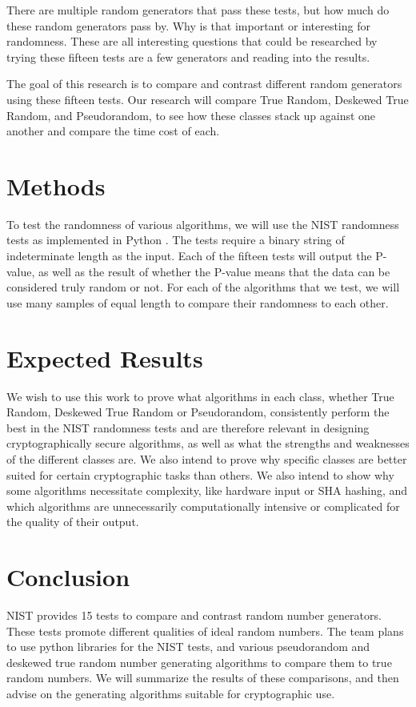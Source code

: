\documentclass[11pt,letterpaper,conference]{IEEEtran}
\begin{document}
There are multiple random generators that pass these tests, but how much do these random
generators pass by. Why is that important or interesting for randomness. These are all interesting
questions that could be researched by trying these fifteen tests are a few generators and reading
into the results.

The goal of this research is to compare and contrast different random generators using these fifteen tests. Our research will compare True Random, Deskewed True Random, and Pseudorandom, to see how these classes stack up against one another and compare the time cost of each.

\section{Methods}
To test the randomness of various algorithms, we will use the NIST randomness tests as
implemented in Python \cite{rtestsuite}. The tests require a binary string of indeterminate length as the input.
Each of the fifteen tests will output the P-value, as well as the result of whether the P-value means
that the data can be considered truly random or not. For each of the algorithms that we test, we
will use many samples of equal length to compare their randomness to each other.

\section{Expected Results}
We wish to use this work to prove what algorithms in each class, whether True Random, Deskewed True
Random or Pseudorandom, consistently perform the best in the NIST randomness tests and are therefore
relevant in designing cryptographically secure algorithms, as well as what the strengths and weaknesses
of the different classes are. We also intend to prove why specific classes
are better suited for certain cryptographic tasks than others. We also intend to show why some algorithms
necessitate complexity, like hardware input or SHA hashing, and which algorithms are unnecessarily
computationally intensive or complicated for the quality of their output.

\section{Conclusion}
NIST provides 15 tests to compare and contrast random number generators. These tests promote different qualities of ideal random numbers. The team plans to use python libraries for the NIST tests, and various pseudorandom and deskewed true random number generating algorithms to compare them to true random numbers. We will summarize the results of these comparisons, and then advise on the generating algorithms suitable for cryptographic use.

\printbibliography[heading=bibintoc, title={References}]
\end{document}
